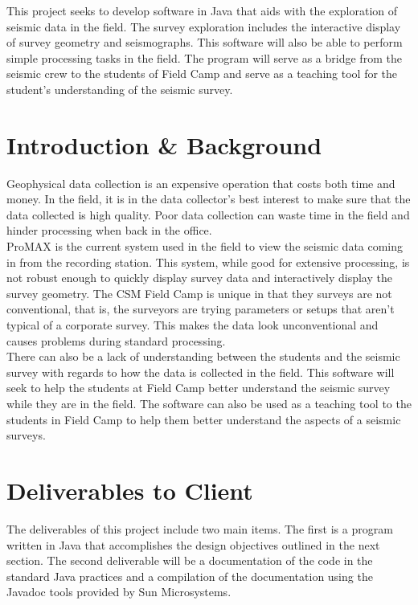\documentclass[12pt]{article}
\begin{document}
This project seeks to develop software in Java that aids with the exploration of seismic data in the field. The survey exploration includes the interactive display of survey geometry and seismographs. This software will also be able to perform simple processing tasks in the field. The program will serve as a bridge from the seismic crew to the students of Field Camp and serve as a teaching tool for the student's understanding of the seismic survey.

\section{Introduction \& Background}

Geophysical data collection is an expensive operation that costs both time and money. In the field, it is in the data collector's best interest to make sure that the data collected is high quality. Poor data collection can waste time in the field and hinder processing when back in the office. \\

ProMAX is the current system used in the field to view the seismic data coming in from the recording station. This system, while good for extensive processing, is not robust enough to quickly display survey data and interactively display the survey geometry. The CSM Field Camp is unique in that they surveys are not conventional, that is, the surveyors are trying parameters or setups that aren't typical of a corporate survey. This makes the data look unconventional and causes problems during standard processing. \\

There can also be a lack of understanding between the students and the seismic survey with regards to how the data is collected in the field. This software will seek to help the students at Field Camp better understand the seismic survey while they are in the field. The software can also be used as a teaching tool to the students in Field Camp to help them better understand the aspects of a seismic surveys.

\section{Deliverables to Client}

The deliverables of this project include two main items. The first is a program written in Java that accomplishes the design objectives outlined in the next section. The second deliverable will be a documentation of the code in the standard Java practices and a compilation of the documentation using the Javadoc tools provided by Sun Microsystems. 
\end{document}
